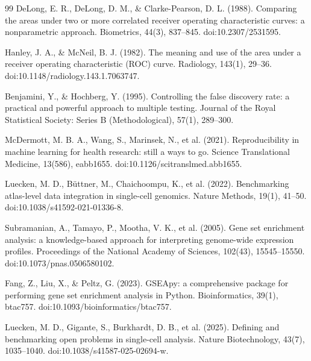 \documentclass[11pt,a4paper]{article}
\begin{document}
\begin{thebibliography}{99}
DeLong, E. R., DeLong, D. M., \& Clarke-Pearson, D. L. (1988).
\newblock Comparing the areas under two or more correlated receiver operating characteristic curves: a nonparametric approach.
\newblock Biometrics, 44(3), 837--845. doi:10.2307/2531595.

Hanley, J. A., \& McNeil, B. J. (1982).
\newblock The meaning and use of the area under a receiver operating characteristic (ROC) curve.
\newblock Radiology, 143(1), 29--36. doi:10.1148/radiology.143.1.7063747.

Benjamini, Y., \& Hochberg, Y. (1995).
\newblock Controlling the false discovery rate: a practical and powerful approach to multiple testing.
\newblock Journal of the Royal Statistical Society: Series B (Methodological), 57(1), 289--300.

McDermott, M. B. A., Wang, S., Marinsek, N., et al. (2021).
\newblock Reproducibility in machine learning for health research: still a ways to go.
\newblock Science Translational Medicine, 13(586), eabb1655. doi:10.1126/scitranslmed.abb1655.

Luecken, M. D., B\"{u}ttner, M., Chaichoompu, K., et al. (2022).
\newblock Benchmarking atlas-level data integration in single-cell genomics.
\newblock Nature Methods, 19(1), 41--50. doi:10.1038/s41592-021-01336-8.

Subramanian, A., Tamayo, P., Mootha, V. K., et al. (2005).
\newblock Gene set enrichment analysis: a knowledge-based approach for interpreting genome-wide expression profiles.
\newblock Proceedings of the National Academy of Sciences, 102(43), 15545--15550. doi:10.1073/pnas.0506580102.

Fang, Z., Liu, X., \& Peltz, G. (2023).
\newblock GSEApy: a comprehensive package for performing gene set enrichment analysis in Python.
\newblock Bioinformatics, 39(1), btac757. doi:10.1093/bioinformatics/btac757.

Luecken, M. D., Gigante, S., Burkhardt, D. B., et al. (2025).
\newblock Defining and benchmarking open problems in single-cell analysis.
\newblock Nature Biotechnology, 43(7), 1035--1040. doi:10.1038/s41587-025-02694-w.


\end{thebibliography}
\end{document}
